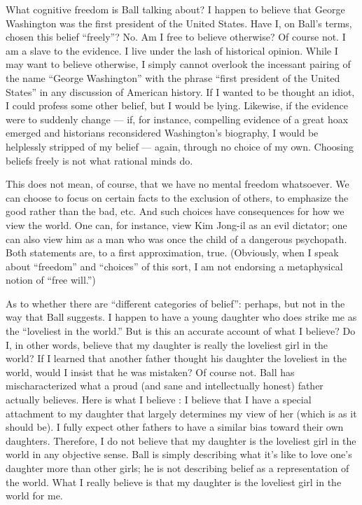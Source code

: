 \documentclass[a4paper,14pt]{extarticle}
\begin{document}
What cognitive freedom is Ball talking about?
I happen to believe that George Washington was the first president of the United States.
Have I, on Ball’s terms, chosen this belief ``freely''?
No.
Am I free to believe otherwise?
Of course not.
I am a slave to the evidence.
I live under the lash of historical opinion.
While I may want to believe otherwise, I simply cannot overlook the incessant pairing of the name ``George Washington'' with the phrase ``first president of the United States'' in any discussion of American history.
If I wanted to be thought an idiot, I could profess some other belief, but I would be lying.
Likewise, if the evidence were to suddenly change --- if, for instance, compelling evidence of a great hoax emerged and historians reconsidered Washington’s biography, I would be helplessly stripped of my belief --- again, through no choice of my own.
Choosing beliefs freely is not what rational minds do.

This does not mean, of course, that we have no mental freedom whatsoever.
We can choose to focus on certain facts to the exclusion of others, to emphasize the good rather than the bad, etc.
And such choices have consequences for how we view the world.
One can, for instance, view Kim Jong-il as an evil dictator;
one can also view him as a man who was once the child of a dangerous psychopath.
Both statements are, to a first approximation, true.
(Obviously, when I speak about ``freedom'' and ``choices'' of this sort, I am not endorsing a metaphysical notion of ``free will.'')

As to whether there are ``different categories of belief'':
perhaps, but not in the way that Ball suggests.
I happen to have a young daughter who does strike me as the ``loveliest in the world.''
But is this an accurate account of what I believe?
Do I, in other words, believe that my daughter is really the loveliest girl in the world?
If I learned that another father thought his daughter the loveliest in the world, would I insist that he was mistaken?
Of course not.
Ball has mischaracterized what a proud (and sane and intellectually honest) father actually believes.
Here is what I believe :
I believe that I have a special attachment to my daughter that largely determines my view of her (which is as it should be).
I fully expect other fathers to have a similar bias toward their own daughters.
Therefore, I do not believe that my daughter is the loveliest girl in the world in any objective sense.
Ball is simply describing what it’s like to love one’s daughter more than other girls;
he is not describing belief as a representation of the world.
What I really believe is that my daughter is the loveliest girl in the world for me.
\end{document}
